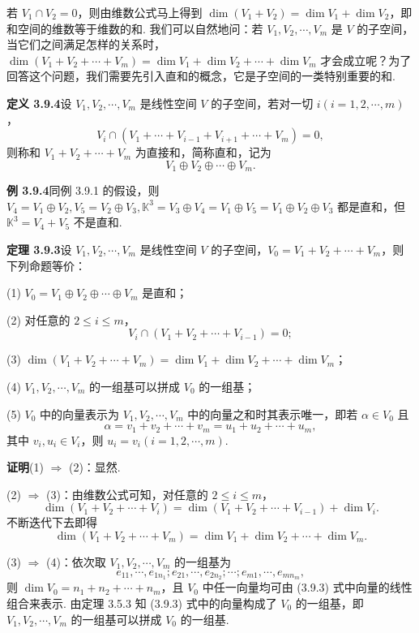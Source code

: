 \documentclass[UTF8,12pt,a4paper,fontset=fandol]{ctexart}
\begin{document}
若 $V_1\cap V_2=0$，则由维数公式马上得到 $\dim(V_1+V_2)=\dim V_1+\dim V_2$，即和空间的维数等于维数的和. 我们可以自然地问：若 $V_1,V_2,\cdots,V_m$ 是 $V$ 的子空间，当它们之间满足怎样的关系时，$\dim(V_1+V_2+\cdots+V_m)=\dim V_1+\dim V_2+\cdots+\dim V_m$ 才会成立呢？为了回答这个问题，我们需要先引入直和的概念，它是子空间的一类特别重要的和.

\noindent\textbf{定义 3.9.4}\quad 设 $V_1,V_2,\cdots,V_m$ 是线性空间 $V$ 的子空间，若对一切 $i(i=1,2,\cdots,m)$，
\[
V_i\cap(V_1+\cdots+V_{i-1}+V_{i+1}+\cdots+V_m)=0,
\]
则称和 $V_1+V_2+\cdots+V_m$ 为直接和，简称直和，记为
\[
V_1\oplus V_2\oplus\cdots\oplus V_m.
\]

\noindent\textbf{例 3.9.4}\quad 同例 3.9.1 的假设，则 $V_4=V_1\oplus V_2,V_5=V_2\oplus V_3,\mathbb{K}^3=V_3\oplus V_4=V_1\oplus V_5=V_1\oplus V_2\oplus V_3$ 都是直和，但 $\mathbb{K}^3=V_4+V_5$ 不是直和.

\noindent\textbf{定理 3.9.3}\quad 设 $V_1,V_2,\cdots,V_m$ 是线性空间 $V$ 的子空间，$V_0=V_1+V_2+\cdots+V_m$，则下列命题等价：

(1) $V_0=V_1\oplus V_2\oplus\cdots\oplus V_m$ 是直和；

(2) 对任意的 $2\leq i\leq m$，
\[
V_i\cap(V_1+V_2+\cdots+V_{i-1})=0;
\]

(3) $\dim(V_1+V_2+\cdots+V_m)=\dim V_1+\dim V_2+\cdots+\dim V_m$；

(4) $V_1,V_2,\cdots,V_m$ 的一组基可以拼成 $V_0$ 的一组基；

(5) $V_0$ 中的向量表示为 $V_1,V_2,\cdots,V_m$ 中的向量之和时其表示唯一，即若 $\alpha\in V_0$ 且
\[
\alpha=v_1+v_2+\cdots+v_m=u_1+u_2+\cdots+u_m,
\]
其中 $v_i,u_i\in V_i$，则 $u_i=v_i(i=1,2,\cdots,m)$.

\noindent\textbf{证明}\quad (1) $\Rightarrow$ (2)：显然.

(2) $\Rightarrow$ (3)：由维数公式可知，对任意的 $2\leq i\leq m$，
\[
\dim(V_1+V_2+\cdots+V_i)=\dim(V_1+V_2+\cdots+V_{i-1})+\dim V_i.
\]
不断迭代下去即得
\[
\dim(V_1+V_2+\cdots+V_m)=\dim V_1+\dim V_2+\cdots+\dim V_m.
\]

(3) $\Rightarrow$ (4)：依次取 $V_1,V_2,\cdots,V_m$ 的一组基为
\begin{equation}
e_{11},\cdots,e_{1n_1};e_{21},\cdots,e_{2n_2};\cdots;e_{m1},\cdots,e_{mn_m},
\tag{3.9.3}
\end{equation}
则 $\dim V_0=n_1+n_2+\cdots+n_m$，且 $V_0$ 中任一向量均可由 (3.9.3) 式中向量的线性组合来表示. 由定理 3.5.3 知 (3.9.3) 式中的向量构成了 $V_0$ 的一组基，即 $V_1,V_2,\cdots,V_m$ 的一组基可以拼成 $V_0$ 的一组基.
\end{document}
